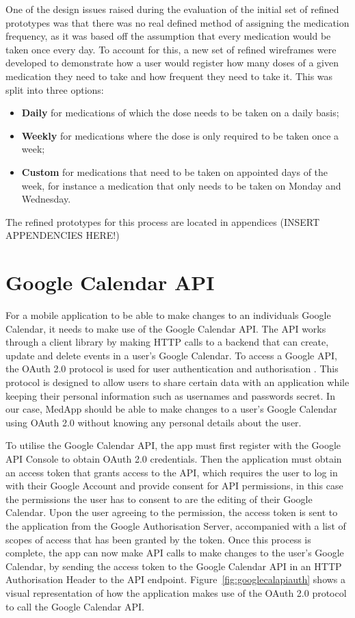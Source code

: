 \documentclass{l4proj}
\begin{document}
One of the design issues raised during the evaluation of the initial set of refined prototypes was that there was no real defined method of assigning the medication frequency, as it was based off the assumption that every medication would be taken once every day. To account for this, a new set of refined wireframes were developed to demonstrate how a user would register how many doses of a given medication they need to take and how frequent they need to take it. This was split into three options: \
\begin{itemize}
    \item \textbf{Daily} for medications of which the dose needs to be taken on a daily basis;
    \item \textbf{Weekly} for medications where the dose is only required to be taken once a week;
    \item \textbf{Custom} for medications that need to be taken on appointed days of the week, for instance a medication that only needs to be taken on Monday and Wednesday.
\end{itemize}

The refined prototypes for this process are located in appendices (INSERT APPENDENCIES HERE!)


\newpage
\section{Google Calendar API}

For a mobile application to be able to make changes to an individuals Google Calendar, it needs to make use of the Google Calendar API. The API works through a client library by making HTTP calls to a backend that can create, update and delete events in a user's Google Calendar. To access a Google API, the OAuth 2.0 protocol is used for user authentication and authorisation \citep{hardt2012oauth}. This protocol is designed to allow users to share certain data with an application while keeping their personal information such as usernames and passwords secret. In our case, MedApp should be able to make changes to a user's Google Calendar using OAuth 2.0 without knowing any personal details about the user.

To utilise the Google Calendar API, the app must first register with the Google API Console to obtain OAuth 2.0 credentials. Then the application must obtain an access token that grants access to the API, which requires the user to log in with their Google Account and provide consent for API permissions, in this case the permissions the user has to consent to are the editing of their Google Calendar. Upon the user agreeing to the permission, the access token is sent to the application from the Google Authorisation Server, accompanied with a list of scopes of access that has been granted by the token. Once this process is complete, the app can now make API calls to make changes to the user's Google Calendar, by sending the access token to the Google Calendar API in an HTTP Authorisation Header to the API endpoint. Figure~\ref{fig:googlecalapiauth} shows a visual representation of how the application makes use of the OAuth 2.0 protocol to call the Google Calendar API.
\end{document}

